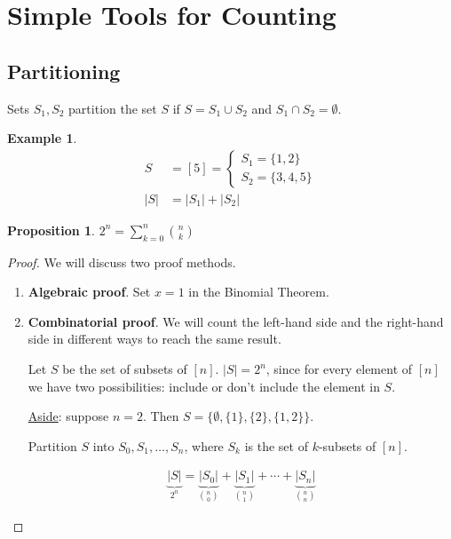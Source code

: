 \documentclass[]{article}
\newtheorem*{proposition}{Proposition}
\theoremstyle{definition}
\newtheorem{ex}{Example}[section]
\newcommand{\union}{\cup}
\newcommand{\intersection}{\cap}
\begin{document}
		\section{Simple Tools for Counting}
			\subsection{Partitioning}
				Sets $S_1, S_2$ partition the set $S$ if $S = S_1 \union S_2$ and $S_1 \intersection S_2 = \emptyset$.
				
				\begin{ex}
					\begin{align*}
						S &= [5] = \begin{cases} 
							S_1 = \{1, 2 \} \\
							S_2 = \{3, 4, 5\}
						\end{cases} \\
						|S| &= |S_1| + |S_2|
					\end{align*}
				\end{ex}
				
				\begin{proposition}
					$\displaystyle 2^n = \sum_{k = 0}^{n} {n \choose k}$
				\end{proposition}
				
				\begin{proof}
					We will discuss two proof methods.
					
					\begin{enumerate}
						\item \textbf{Algebraic proof}. Set $x = 1$ in the Binomial Theorem.
						\item \textbf{Combinatorial proof}. We will count the left-hand side and the right-hand side in different ways to reach the same result.
						
						Let $S$ be the set of subsets of $[n]$. $|S| = 2^n$, since for every element of $[n]$ we have two possibilities: include or don't include the element in $S$.
						
						\underline{Aside}: suppose $n = 2$. Then $S = \{\emptyset, \{1\}, \{2\}, \{1, 2\}\}$. 
						
						Partition $S$ into $S_0, S_1, \ldots, S_n$, where $S_k$ is the set of $k$-subsets of $[n]$.
						
						\begin{align*}
							\underbrace{|S|}_{2^n} = \underbrace{|S_0|}_{{n \choose 0}} + \underbrace{|S_1|}_{n \choose 1} + \cdots + \underbrace{|S_n|}_{n \choose n}
						\end{align*}
					\end{enumerate}
				\end{proof}
				
\end{document}
